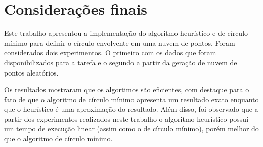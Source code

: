 \documentclass{article}
\begin{document}
\section{Considerações finais}

Este trabalho apresentou a implementação do algoritmo heurístico e de círculo mínimo para definir o círculo envolvente em uma nuvem de pontos. Foram considerados dois experimentos. O primeiro com os dados que foram disponibilizados para a tarefa e o segundo a partir da geração de nuvem de pontos aleatórios.

Os resultados mostraram que os algortimos são eficientes, com destaque para o fato de que o algoritmo de círculo mínimo apresenta um resultado exato enquanto que o heurístico é uma aproximação do resultado. Além disso, foi observado que a partir dos experimentos realizados neste trabalho o algoritmo heurístico possui um tempo de execução linear (assim como o de círculo mínimo), porém melhor do que o algoritmo de círculo mínimo.
\end{document}
